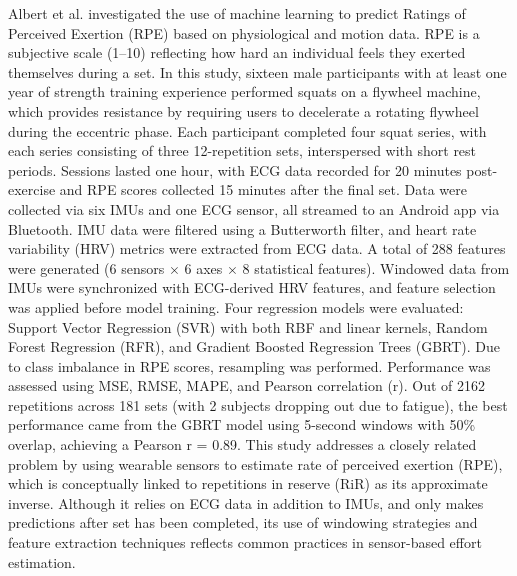 \documentclass[conference]{IEEEtran}
\begin{document}
Albert et al. \cite{albert2021using} investigated the use of machine learning to predict Ratings of Perceived Exertion (RPE) based on physiological and motion data. RPE is a subjective scale (1--10) reflecting how hard an individual feels they exerted themselves during a set. In this study, sixteen male participants with at least one year of strength training experience performed squats on a flywheel machine, which provides resistance by requiring users to decelerate a rotating flywheel during the eccentric phase. Each participant completed four squat series, with each series consisting of three 12-repetition sets, interspersed with short rest periods. Sessions lasted one hour, with ECG data recorded for 20 minutes post-exercise and RPE scores collected 15 minutes after the final set. Data were collected via six IMUs and one ECG sensor, all streamed to an Android app via Bluetooth. IMU data were filtered using a Butterworth filter, and heart rate variability (HRV) metrics were extracted from ECG data. A total of 288 features were generated (6 sensors $\times$ 6 axes $\times$ 8 statistical features). Windowed data from IMUs were synchronized with ECG-derived HRV features, and feature selection was applied before model training. Four regression models were evaluated: Support Vector Regression (SVR) with both RBF and linear kernels, Random Forest Regression (RFR), and Gradient Boosted Regression Trees (GBRT). Due to class imbalance in RPE scores, resampling was performed. Performance was assessed using MSE, RMSE, MAPE, and Pearson correlation (r). Out of 2162 repetitions across 181 sets (with 2 subjects dropping out due to fatigue), the best performance came from the GBRT model using 5-second windows with 50\% overlap, achieving a Pearson r = 0.89. This study addresses a closely related problem by using wearable sensors to estimate rate of perceived exertion (RPE), which is conceptually linked to repetitions in reserve (RiR) as its approximate inverse. Although it relies on ECG data in addition to IMUs, and only makes predictions after set has been completed, its use of windowing strategies and feature extraction techniques reflects common practices in sensor-based effort estimation.
\end{document}
